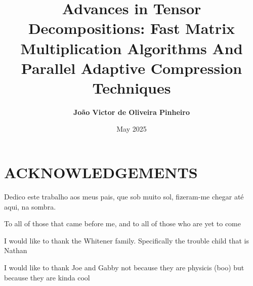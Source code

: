 \documentclass[MS]{wfuthesis}
\title{\textbf{Advances in Tensor Decompositions: Fast Matrix Multiplication Algorithms And Parallel Adaptive Compression Techniques}}
\author{\textbf{João Victor de Oliveira Pinheiro}}
\date{May 2025}
\begin{document}
    
    \maketitle
    \section*{\textbf{ACKNOWLEDGEMENTS}} 
        Dedico este trabalho aos meus pais, que sob muito sol, fizeram-me chegar até aqui, na sombra.
        
        To all of those that came before me, and to all of those who are yet to come

        I would like to thank the Whitener family. Specifically the trouble child that is Nathan

        I would like to thank Joe and Gabby not because they are physicis (boo)
        but because they are kinda cool





    \tableofcontents
    \newpage





    \listoffigures
    \newpage






    \printnomenclature
    \newpage
\end{document}
